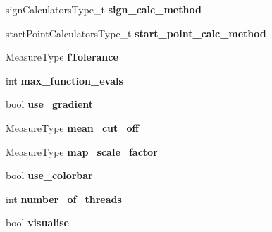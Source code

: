 \begin{DoxyCompactItemize}
\item 
\hypertarget{struct_ox_1_1_tomato_options_a2cf923d6d04fb8cb510db2623e93119d}{sign\-Calculators\-Type\-\_\-t {\bfseries sign\-\_\-calc\-\_\-method}}\label{struct_ox_1_1_tomato_options_a2cf923d6d04fb8cb510db2623e93119d}

\item 
\hypertarget{struct_ox_1_1_tomato_options_a9da2993961d10c848b0860284900c869}{start\-Point\-Calculators\-Type\-\_\-t {\bfseries start\-\_\-point\-\_\-calc\-\_\-method}}\label{struct_ox_1_1_tomato_options_a9da2993961d10c848b0860284900c869}

\item 
\hypertarget{struct_ox_1_1_tomato_options_ae2ac4c46e46b4d183c6944771701040b}{Measure\-Type {\bfseries f\-Tolerance}}\label{struct_ox_1_1_tomato_options_ae2ac4c46e46b4d183c6944771701040b}

\item 
\hypertarget{struct_ox_1_1_tomato_options_a9b864c01b6b0b4e4d5a56470f6c5f004}{int {\bfseries max\-\_\-function\-\_\-evals}}\label{struct_ox_1_1_tomato_options_a9b864c01b6b0b4e4d5a56470f6c5f004}

\item 
\hypertarget{struct_ox_1_1_tomato_options_a367c540e5413f8ffa3a6bc6ef5781b45}{bool {\bfseries use\-\_\-gradient}}\label{struct_ox_1_1_tomato_options_a367c540e5413f8ffa3a6bc6ef5781b45}

\item 
\hypertarget{struct_ox_1_1_tomato_options_af81d1a55409036109d253b313d59e972}{Measure\-Type {\bfseries mean\-\_\-cut\-\_\-off}}\label{struct_ox_1_1_tomato_options_af81d1a55409036109d253b313d59e972}

\item 
\hypertarget{struct_ox_1_1_tomato_options_ab245e10cf32b36c48d66208a5f505099}{Measure\-Type {\bfseries map\-\_\-scale\-\_\-factor}}\label{struct_ox_1_1_tomato_options_ab245e10cf32b36c48d66208a5f505099}

\item 
\hypertarget{struct_ox_1_1_tomato_options_aa762826a11ff767aa969bd66c29b577f}{bool {\bfseries use\-\_\-colorbar}}\label{struct_ox_1_1_tomato_options_aa762826a11ff767aa969bd66c29b577f}

\item 
\hypertarget{struct_ox_1_1_tomato_options_a54efb4945f2857ee4ed9e1d5552fc3dd}{int {\bfseries number\-\_\-of\-\_\-threads}}\label{struct_ox_1_1_tomato_options_a54efb4945f2857ee4ed9e1d5552fc3dd}

\item 
\hypertarget{struct_ox_1_1_tomato_options_a043a4cf0e29a4482406e95f27ab2f860}{bool {\bfseries visualise}}\label{struct_ox_1_1_tomato_options_a043a4cf0e29a4482406e95f27ab2f860}


\end{DoxyCompactItemize}
